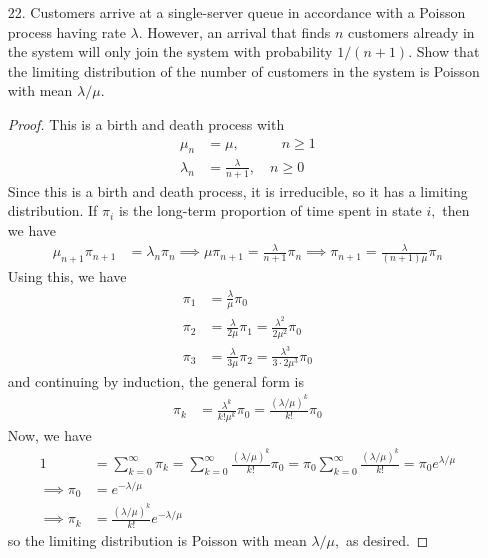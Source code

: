\documentclass{article}
\begin{document}
\begin{itemize}
	\item[22.] Customers arrive at a single-server queue in accordance with a Poisson process having rate $\lambda.$ However, an arrival that finds $n$ customers already in the system will only join the system with probability $1/(n+1).$ Show that the limiting distribution of the number of customers in the system is Poisson with mean $\lambda/\mu.$
		\begin{proof}
			This is a birth and death process with
			\begin{align*}
				\mu_n &= \mu, \quad \quad \quad n\ge 1 \\
				\lambda_n &= \frac{\lambda}{n+1}, \quad n\ge 0
			\end{align*}
			Since this is a birth and death process, it is irreducible, so it has a limiting distribution. If $\pi_i$ is the long-term proportion of time spent in state $i,$ then we have
			\begin{align*}
				\mu_{n+1} \pi_{n+1} &= \lambda_n \pi_n \implies \mu \pi_{n+1} = \frac{\lambda}{n+1} \pi_n \implies \pi_{n+1} = \frac{\lambda}{(n+1)\mu} \pi_n
			\end{align*}
			Using this, we have
			\begin{align*}
				\pi_1 &= \frac{\lambda}{\mu} \pi_0 \\
				\pi_2 &= \frac{\lambda}{2\mu} \pi_1 = \frac{\lambda^2}{2\mu^2} \pi_0 \\
				\pi_3 &= \frac{\lambda}{3\mu} \pi_2 = \frac{\lambda^3}{3\cdot 2\mu^3} \pi_0
			\end{align*}
			and continuing by induction, the general form is 
			\begin{align*}
				\pi_k &= \frac{\lambda^k}{k! \mu^k} \pi_0 = \frac{(\lambda/\mu)^k}{k!} \pi_0
			\end{align*}
			Now, we have
			\begin{align*}
				1 &= \sum_{k=0}^{\infty} \pi_k = \sum_{k=0}^{\infty} \frac{(\lambda/\mu)^k}{k!} \pi_0 = \pi_0 \sum_{k=0}^{\infty} \frac{(\lambda/\mu)^k}{k!} = \pi_0 e^{\lambda/\mu} \\
				\implies \pi_0 &= e^{-\lambda/\mu} \\
				\implies \pi_k &= \frac{(\lambda/\mu)^k}{k!} e^{-\lambda/\mu}
			\end{align*}	
			so the limiting distribution is Poisson with mean $\lambda/\mu,$ as desired.
		\end{proof}
		
\end{itemize}
\end{document}
